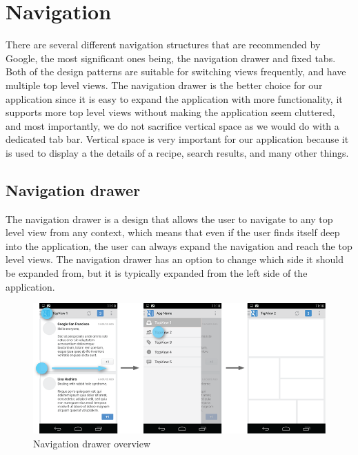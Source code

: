 \section{Navigation}\label{sec:navigation}
There are several different navigation structures that are recommended by Google, the most significant ones being, the navigation drawer and fixed tabs. Both of the design patterns are suitable for switching views frequently, and have multiple top level views. 
The navigation drawer is the better choice for our application since it is easy to expand the application with more functionality, it supports more top level views without making the application seem cluttered, and most importantly, we do not sacrifice vertical space as we would do with a dedicated tab bar. Vertical space is very important for our application because it is used to display a the details of a recipe, search results, and many other things.

\subsection{Navigation drawer}
The navigation drawer is a design that allows the user to navigate to any top level view from any context, which means that even if the user finds itself deep into the application, the user can always expand the navigation and reach the top level views. 
The navigation drawer has an option to change which side it should be expanded from, but it is typically expanded from the left side of the application.
\begin{figure}[H]
\centering
\includegraphics[width=0.9\linewidth]{img/screenshots/navigation_drawer_overview.png}
\caption{Navigation drawer overview \cite{guidelines-navigationdrawer}}
\label{fig:navigationdrawer}
\end{figure}

